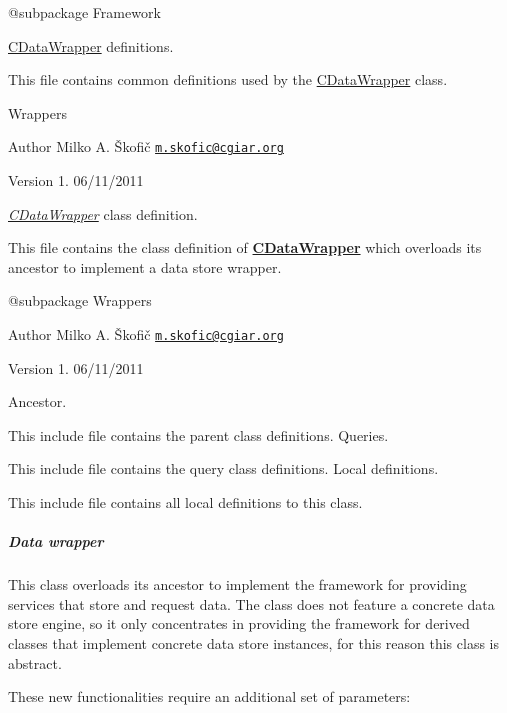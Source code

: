 \begin{DoxyVerb} @subpackage        Framework\end{DoxyVerb}


\hyperlink{class_c_data_wrapper}{C\-Data\-Wrapper} definitions.

This file contains common definitions used by the \hyperlink{class_c_data_wrapper}{C\-Data\-Wrapper} class.

Wrappers

\begin{DoxyAuthor}{Author}
Milko A. Škofič \href{mailto:m.skofic@cgiar.org}{\tt m.\-skofic@cgiar.\-org} 
\end{DoxyAuthor}
\begin{DoxyVersion}{Version}
1. 06/11/2011
\end{DoxyVersion}
{\itshape \hyperlink{class_c_data_wrapper}{C\-Data\-Wrapper}} class definition.

This file contains the class definition of {\bfseries \hyperlink{class_c_data_wrapper}{C\-Data\-Wrapper}} which overloads its ancestor to implement a data store wrapper.

\begin{DoxyVerb} @subpackage        Wrappers
\end{DoxyVerb}


\begin{DoxyAuthor}{Author}
Milko A. Škofič \href{mailto:m.skofic@cgiar.org}{\tt m.\-skofic@cgiar.\-org} 
\end{DoxyAuthor}
\begin{DoxyVersion}{Version}
1. 06/11/2011
\end{DoxyVersion}
Ancestor.

This include file contains the parent class definitions. Queries.

This include file contains the query class definitions. Local definitions.

This include file contains all local definitions to this class. \subparagraph*{Data wrapper}

This class overloads its ancestor to implement the framework for providing services that store and request data. The class does not feature a concrete data store engine, so it only concentrates in providing the framework for derived classes that implement concrete data store instances, for this reason this class is abstract.

These new functionalities require an additional set of parameters\-:


